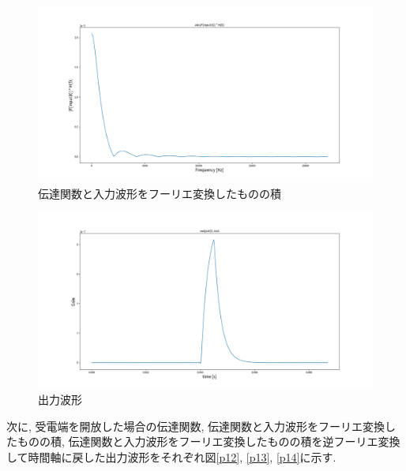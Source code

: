 \documentclass[a4j,12pt,]{jarticle}
\begin{document}
\begin{figure}[H]
  \begin{center}
    \includegraphics[width=160mm]{report/shortCircuitAtReceivingEndWithAttenuationConstant/productOfTFAndFTTOfInputWaveformAbs.png}
    \caption{伝達関数と入力波形をフーリエ変換したものの積}
    \label{p10}
  \end{center}
\end{figure}

\begin{figure}[H]
  \begin{center}
    \includegraphics[width=160mm]{report/shortCircuitAtReceivingEndWithAttenuationConstant/outputWaveformTimeAxis.png}
    \caption{出力波形}
    \label{p11}
  \end{center}
\end{figure}

次に, 受電端を開放した場合の伝達関数, 伝達関数と入力波形をフーリエ変換したものの積, 伝達関数と入力波形をフーリエ変換したものの積を逆フーリエ変換して時間軸に戻した出力波形をそれぞれ図\ref{p12}, \ref{p13}, \ref{p14}に示す.
\end{document}
